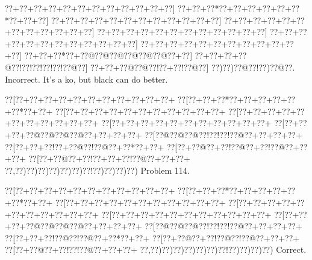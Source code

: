 \documentclass[a5paper]{article}
\begin{document}
\begin{center}
{\goo
\0??+\0??+\0??+\0??+\0??+\0??+\0??+\0??+\0??+\0??+\0??+\0??]
\0??+\0??+\0??*\0??+\0??+\0??+\0??+\0??+\0??*\0??+\0??+\0??]
\0??+\0??+\0??+\0??+\0??+\0??+\0??+\0??+\0??+\0??+\0??+\0??]
\0??+\0??+\0??+\0??+\0??+\0??+\0??+\0??+\0??+\0??+\0??+\0??]
\0??+\0??+\0??+\0??+\0??+\0??+\0??+\0??+\0??+\0??+\0??+\0??]
\0??+\0??+\0??+\0??+\0??+\0??+\0??+\0??+\0??+\0??+\0??+\0??]
\0??+\0??+\0??+\0??+\0??+\0??+\0??+\0??+\0??+\0??+\0??+\0??]
\0??+\0??+\0??*\0??+\0??@\0??@\0??@\0??@\0??@\0??@\0??+\0??]
\0??+\0??+\0??+\0??@\0??!\0??!\0??!\0??!\0??!\0??@\0??]
\0??+\0??+\0??@\0??@\0??!\0??+\0??!\0??@\0??]
\0??)\0??)\0??@\0??!\0??)\0??@\0??.
}
Incorrect. It's a ko, but black can do better. 

\end{center}
\newpage
\begin{center}
{\goo
\0??[\0??+\0??+\0??+\0??+\0??+\0??+\0??+\0??+\0??+\0??+\0??+
\0??[\0??+\0??+\0??*\0??+\0??+\0??+\0??+\0??+\0??*\0??+\0??+
\0??[\0??+\0??+\0??+\0??+\0??+\0??+\0??+\0??+\0??+\0??+\0??+
\0??[\0??+\0??+\0??+\0??+\0??+\0??+\0??+\0??+\0??+\0??+\0??+
\0??[\0??+\0??+\0??+\0??+\0??+\0??+\0??+\0??+\0??+\0??+\0??+
\0??[\0??+\0??+\0??+\0??@\0??@\0??@\0??@\0??+\0??+\0??+\0??+
\0??[\0??@\0??@\0??@\0??!\0??!\0??!\0??@\0??+\0??+\0??+\0??+
\0??[\0??+\0??+\0??!\0??+\0??@\0??!\0??@\0??+\0??*\0??+\0??+
\0??[\0??+\0??@\0??+\0??!\0??@\0??+\0??!\0??@\0??+\0??+\0??+
\0??[\0??+\0??@\0??+\0??!\0??+\0??+\0??!\0??@\0??+\0??+\0??+
\0??,\0??)\0??)\0??)\0??)\0??)\0??)\0??!\0??)\0??)\0??)\0??)
}
Problem 114.

\end{center}
\begin{center}
{\goo
\0??[\0??+\0??+\0??+\0??+\0??+\0??+\0??+\0??+\0??+\0??+\0??+
\0??[\0??+\0??+\0??*\0??+\0??+\0??+\0??+\0??+\0??*\0??+\0??+
\0??[\0??+\0??+\0??+\0??+\0??+\0??+\0??+\0??+\0??+\0??+\0??+
\0??[\0??+\0??+\0??+\0??+\0??+\0??+\0??+\0??+\0??+\0??+\0??+
\0??[\0??+\0??+\0??+\0??+\0??+\0??+\0??+\0??+\0??+\0??+\0??+
\0??[\0??+\0??+\0??+\0??@\0??@\0??@\0??@\0??+\0??+\0??+\0??+
\0??[\0??@\0??@\0??@\0??!\0??!\0??!\0??@\0??+\0??+\0??+\0??+
\0??[\0??+\0??+\0??!\0??@\0??!\0??@\0??+\0??*\0??+\0??+
\0??[\0??+\0??@\0??+\0??!\0??@\0??!\0??@\0??+\0??+\0??+
\0??[\0??+\0??@\0??+\0??!\0??!\0??@\0??+\0??+\0??+
\0??,\0??)\0??)\0??)\0??)\0??)\0??)\0??!\0??)\0??)\0??)\0??)
}
Correct. 

\end{center}
\end{document}
